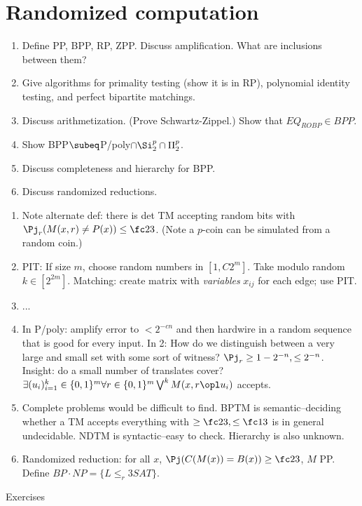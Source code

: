 \section{Randomized computation}
\begin{enumerate}
\item
Define PP, BPP, RP, ZPP. Discuss amplification. What are inclusions between them?
\item
Give algorithms for primality testing (show it is in RP), polynomial identity testing, and perfect bipartite matchings.
\item
Discuss arithmetization. (Prove Schwartz-Zippel.) Show that $EQ_{ROBP}\in BPP$.
\item
Show BPP$\subeq$P/poly$\cap\Si_2^p\cap \Pi_2^p$.
\item 
Discuss completeness and hierarchy for BPP.
\item
Discuss randomized reductions. 
\end{enumerate}
\begin{enumerate}
\item 
Note alternate def: there is det TM accepting random bits with $\Pj_r(M(x,r)\ne P(x))\le \fc 23$.
(Note a $p$-coin can be simulated from a random coin.)
\item PIT: If size $m$, choose random numbers in $[1,C2^m]$. Take modulo random $k\in [2^{2m}]$. Matching: create matrix with {\it variables} $x_{ij}$ for each edge; use PIT.
\item ...
\item In P/poly: amplify error to $<2^{-cn}$ and then hardwire in a random sequence that is good for every input. In 2: How do we distinguish between a very large and small set with some sort of witness? $\Pj_r\ge 1-2^{-n}, \le 2^{-n}$. Insight: do a small number of translates cover? $\exists (u_i)_{i=1}^k \in \{0,1\}^m \forall r\in \{0,1\}^m \bigvee^k M(x,r\opl u_i)$ accepts.
\item Complete problems would be difficult to find. BPTM is semantic--deciding whether a TM accepts everything with $\ge\fc23,\le \fc 13$ is in general undecidable. NDTM is syntactic--easy to check. Hierarchy is also unknown.
\item Randomized reduction: for all $x$, $\Pj(C(M(x))=B(x))\ge \fc 23$, $M$ PP. Define $BP\cdot NP=\{L\le_r3SAT\}$.
\end{enumerate}
Exercises
